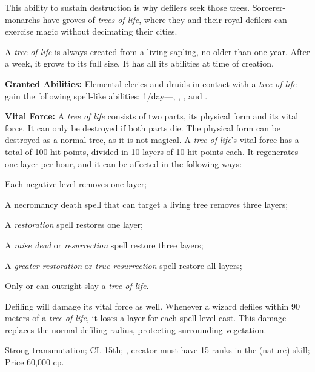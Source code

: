 This ability to sustain destruction is why defilers seek those trees. Sorcerer-monarchs have groves of \emph{trees of life}, where they and their royal defilers can exercise magic without decimating their cities.

A \emph{tree of life} is always created from a living sapling, no older than one year. After a week, it grows to its full size. It has all its abilities at time of creation.

\textbf{Granted Abilities:} Elemental clerics and druids in contact with a \emph{tree of life} gain the following spell-like abilities: 1/day---, , , and .

\textbf{Vital Force:} A \emph{tree of life} consists of two parts, its physical form and its vital force. It can only be destroyed if both parts die. The physical form can be destroyed as a normal tree, as it is not magical. A \emph{tree of life}'s vital force has a total of 100 hit points, divided in 10 layers of 10 hit points each. It regenerates one layer per hour, and it can be affected in the following ways:
\begin{itemize*}
    \item Each negative level removes one layer;
    \item A necromancy death spell that can target a living tree removes three layers;
    \item A \emph{restoration} spell restores one layer;
    \item A \emph{raise dead} or \emph{resurrection} spell restore three layers;
    \item A \emph{greater restoration} or \emph{true resurrection} spell restore all layers;
    \item Only  or  can outright slay a \emph{tree of life}.
\end{itemize*}

Defiling will damage its vital force as well. Whenever a wizard defiles within 90 meters of a \emph{tree of life}, it loses a layer for each spell level cast. This damage replaces the normal defiling radius, protecting surrounding vegetation.

Strong transmutation; CL 15th; , creator must have 15 ranks in the  (nature) skill; Price 60,000 cp.

